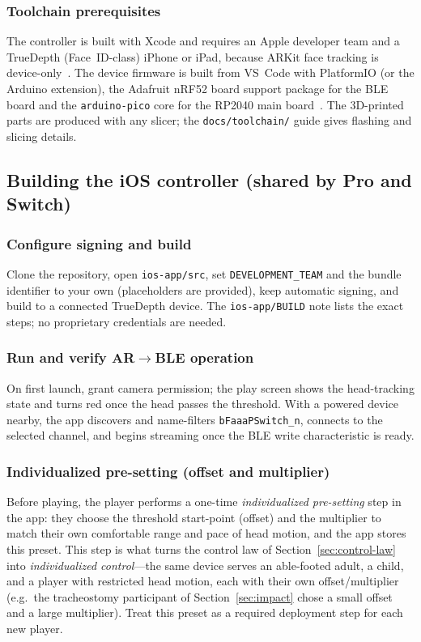 \subsubsection{Toolchain prerequisites}
\label{sec:impl-toolchain}
The controller is built with Xcode and requires an Apple developer team and a
TrueDepth (Face~ID-class) iPhone or iPad, because ARKit face tracking is
device-only~\cite{arkit}. The device firmware is built from VS~Code with
PlatformIO (or the Arduino extension), the Adafruit nRF52 board support package
for the BLE board and the \texttt{arduino-pico} core for the RP2040 main
board~\cite{rp2040}. The 3D-printed parts are produced with any slicer; the
\texttt{docs/toolchain/} guide gives flashing and slicing details.

\subsection{Building the iOS controller (shared by Pro and Switch)}
\label{sec:impl-ios}

\subsubsection{Configure signing and build}
\label{sec:impl-ios-build}
Clone the repository, open \texttt{ios-app/src}, set \texttt{DEVELOPMENT\_TEAM}
and the bundle identifier to your own (placeholders are provided), keep automatic
signing, and build to a connected TrueDepth device. The \texttt{ios-app/BUILD}
note lists the exact steps; no proprietary credentials are needed.

\subsubsection{Run and verify AR$\rightarrow$BLE operation}
\label{sec:impl-ios-verify}
On first launch, grant camera permission; the play screen shows the head-tracking
state and turns red once the head passes the threshold. With a powered device
nearby, the app discovers and name-filters \texttt{bFaaaPSwitch\_n}, connects to
the selected channel, and begins streaming once the BLE write characteristic is
ready.

\subsubsection{Individualized pre-setting (offset and multiplier)}
\label{sec:impl-preset}
Before playing, the player performs a one-time \emph{individualized pre-setting}
step in the app: they choose the threshold start-point (offset) and the multiplier
to match their own comfortable range and pace of head motion, and the app stores
this preset. This step is what turns the control law of
Section~\ref{sec:control-law} into \emph{individualized control}---the same device
serves an able-footed adult, a child, and a player with restricted head motion,
each with their own offset/multiplier (e.g.\ the tracheostomy participant of
Section~\ref{sec:impact} chose a small offset and a large multiplier). Treat this
preset as a required deployment step for each new player.

